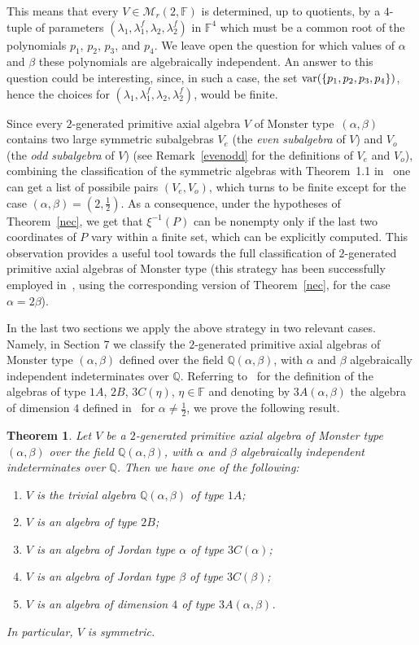 \documentclass[a4paper]{amsart}
\newtheorem{theorem}[lemma]{Theorem}
\newcommand{\Var}{{\rm var}}
\newcommand{\Q}{{\mathbb Q}}
\newcommand{\F}{{\mathbb F}}
\newcommand{\lmu}{\lambda_1}
\newcommand{\lmf}{\lambda_1^f}
\newcommand{\lmd}{\lambda_2}
\newcommand{\lmdf}{\lambda_2^f}
\newcommand{\al}{\alpha}
\newcommand{\bt}{\beta}
\begin{document}
This means that every $V\in   {\mathcal M_r}(2, \F)$ is determined, up to quotients, by a $4$-tuple of parameters $(\lmu, \lmf, \lmd, \lmdf)$ in $\F^4$ which must be a common root of the polynomials $p_1$, $p_2$, $p_3$, and $p_4$.  We leave open the question for which values of $\al$ and $\bt$ these polynomials are algebraically independent. An answer to this question could be interesting, since, in such a case, the set  ${\Var}(\{p_1, p_2, p_3, p_4\})$, hence the choices for $(\lmu, \lmf, \lmd, \lmdf)$,  would be finite.

Since every $2$-generated primitive axial algebra $V$ of Monster type~$(\al, \bt)$ contains two large symmetric subalgebras $V_e$ (the \textit{even subalgebra} of $V$) and $V_o$ (the \textit{odd subalgebra} of $V$) (see Remark~\ref{evenodd} for the definitions of $V_e$ and $V_o$),  combining the classification of the symmetric algebras with Theorem~1.1 in~\cite{axet} one can get a list of  possibile pairs $(V_e, V_o)$, which turns to be  finite except for the case $(\al, \bt)=(2,\frac{1}{2})$. As a consequence, under the hypotheses of Theorem~\ref{nec}, we get that $\xi^{-1}(P)$ can be nonempty only if the last two coordinates of $P$ vary within a finite set, which can be explicitly computed. This observation provides a useful tool towards the full classification of $2$-generated primitive axial algebras of Monster type (this strategy has been successfully employed in~\cite{FMS2}, using the corresponding version of Theorem~\ref{nec}, for the case $\al=2\bt$). 


In the last two sections we apply the above strategy in two relevant cases. Namely, in Section 7 we classify  the $2$-generated primitive axial algebras of Monster type $(\alpha, \beta)$ defined over the field $\Q(\al, \bt)$, with $\al$ and $\bt$ algebraically independent indeterminates over $\Q$. Referring to~\cite{HRS1} for the definition of the algebras of type $1A$, $2B$, $3C(\eta)$, $\eta\in \F$ and denoting by $3A(\al,\bt)$ the algebra of dimension $4$ defined in~\cite[Table~9]{R} for $\al\neq \frac{1}{2}$, we prove the following result.

\begin{theorem}\label{symmetric} 
Let $V$ be a $2$-generated primitive axial algebra of Monster type $(\al, \bt)$ over the field $\Q(\al, \bt)$,  with $\al$ and $\bt$ algebraically independent indeterminates over $\Q$. Then we have one of  the following:
\begin{enumerate}
\item $V$ is the trivial algebra $\Q(\al, \bt)$ of type $1A$;
\item $V$ is an algebra of type $2B$;
\item $V$ is an algebra of Jordan type $\al$ of type $3C(\al)$;
\item $V$ is an algebra of Jordan type $\bt$ of type $3C(\bt)$;
\item $V$ is an algebra of dimension $4$ of type $3A(\al, \bt)$. 
\end{enumerate}
In particular, $V$ is symmetric.
\end{theorem}
\end{document}
